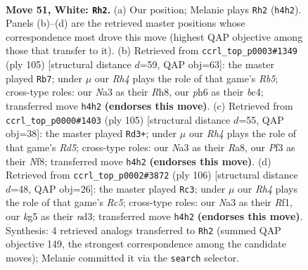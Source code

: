 \documentclass[11pt]{article}
\begin{document}
\clearpage

\begin{figure}[p]\centering
\begin{subfigure}{0.46\textwidth}\centering
\resizebox{\linewidth}{!}{%
\newchessgame
\chessboard[
  setfen={6r1/p7/1pr1p2p/n4pk1/2P1P2R/N1B2P2/P3K1P1/2R5 w - - 1 51},
  showmover=false,
  pgfstyle=straightmove, color=movearrow, markmove={h4-h2}
]}
\caption{}
\end{subfigure}\hfill
\begin{subfigure}{0.46\textwidth}\centering
\resizebox{\linewidth}{!}{%
\newchessgame
\chessboard[
  setfen={7r/3bkp2/5p1p/p3pP2/1rB3PR/KP6/2P4P/3R4 b - - 2 53},
  showmover=false,
  pgfstyle=straightmove, color=movearrow, markmove={b4-b7}
]}
\caption{}
\end{subfigure}
\\[4pt]
\begin{subfigure}{0.46\textwidth}\centering
\resizebox{\linewidth}{!}{%
\newchessgame
\chessboard[
  setfen={r4n1k/5p2/2R1p2p/4P1pN/p2r1PPP/R1P2K2/8/8 b - - 0 53},
  showmover=false,
  pgfstyle=straightmove, color=movearrow, markmove={d4-d3}
]}
\caption{}
\end{subfigure}\hfill
\begin{subfigure}{0.46\textwidth}\centering
\resizebox{\linewidth}{!}{%
\newchessgame
\chessboard[
  setfen={1r6/5p2/p4rk1/2R3p1/3Np1Pp/1P1nP2P/5P2/5RK1 w - - 13 54},
  showmover=false,
  pgfstyle=straightmove, color=movearrow, markmove={c5-c3}
]}
\caption{}
\end{subfigure}
\caption{\textbf{Move 51, White: \texttt{Rh2}.} (a) Our position; Melanie plays \texttt{Rh2} (\texttt{h4h2}). Panels (b)--(d) are the retrieved master positions whose correspondence most drove this move (highest QAP objective among those that transfer to it). (b) Retrieved from \texttt{ccrl\_top\_p0003\#1349} (ply 105) [structural distance $d$=59, QAP obj=63]: the master played \texttt{Rb7}; under $\mu$ our \emph{Rh4} plays the role of that game's \emph{Rb5}; cross-type roles: our \emph{N}a3 as their \emph{R}h8, our \emph{p}h6 as their \emph{b}c4; transferred move \texttt{h4h2} \textbf{(endorses this move)}. (c) Retrieved from \texttt{ccrl\_top\_p0000\#1403} (ply 105) [structural distance $d$=55, QAP obj=38]: the master played \texttt{Rd3+}; under $\mu$ our \emph{Rh4} plays the role of that game's \emph{Rd5}; cross-type roles: our \emph{N}a3 as their \emph{R}a8, our \emph{P}f3 as their \emph{N}f8; transferred move \texttt{h4h2} \textbf{(endorses this move)}. (d) Retrieved from \texttt{ccrl\_top\_p0002\#3872} (ply 106) [structural distance $d$=48, QAP obj=26]: the master played \texttt{Rc3}; under $\mu$ our \emph{Rh4} plays the role of that game's \emph{Rc5}; cross-type roles: our \emph{N}a3 as their \emph{R}f1, our \emph{k}g5 as their \emph{n}d3; transferred move \texttt{h4h2} \textbf{(endorses this move)}. Synthesis: 4 retrieved analogs transferred to \texttt{Rh2} (summed QAP objective 149, the strongest correspondence among the candidate moves); Melanie committed it via the \texttt{search} selector.}
\label{fig:thought-m100}
\end{figure}
\end{document}

